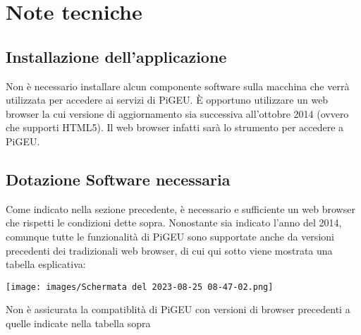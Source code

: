 \documentclass{article}
\begin{document}
    \section{Note tecniche}
    \subsection{Installazione dell'applicazione}
    Non è necessario installare alcun componente software sulla macchina che verrà utilizzata per accedere ai servizi di PiGEU. È opportuno utilizzare un web browser la cui versione di aggiornamento sia successiva all'ottobre 2014 (ovvero che supporti HTML5). Il web browser infatti sarà lo strumento per accedere a PiGEU.
    \subsection{Dotazione Software necessaria}
    Come indicato nella sezione precedente, è necessario e sufficiente un web browser che rispetti le condizioni dette sopra. Nonostante sia indicato l'anno del 2014, comunque tutte le funzionalità di PiGEU sono supportate anche da versioni precedenti dei tradizionali web browser, di cui qui sotto viene mostrata una tabella esplicativa:

    \texttt{[image: images/Schermata del 2023-08-25 08-47-02.png]}

    Non è assicurata la compatiblità di PiGEU con versioni di browser precedenti a quelle indicate nella tabella sopra
\end{document}

